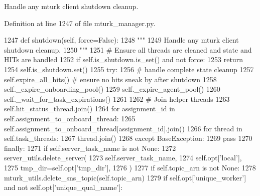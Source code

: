 \begin{DoxyVerb}Handle any mturk client shutdown cleanup.
\end{DoxyVerb}
 

Definition at line 1247 of file mturk\+\_\+manager.\+py.


\begin{DoxyCode}
1247     \textcolor{keyword}{def }shutdown(self, force=False):
1248         \textcolor{stringliteral}{"""}
1249 \textcolor{stringliteral}{        Handle any mturk client shutdown cleanup.}
1250 \textcolor{stringliteral}{        """}
1251         \textcolor{comment}{# Ensure all threads are cleaned and state and HITs are handled}
1252         \textcolor{keywordflow}{if} self.is\_shutdown.is\_set() \textcolor{keywordflow}{and} \textcolor{keywordflow}{not} force:
1253             \textcolor{keywordflow}{return}
1254         self.is\_shutdown.set()
1255         \textcolor{keywordflow}{try}:
1256             \textcolor{comment}{# handle complete state cleanup}
1257             self.expire\_all\_hits()  \textcolor{comment}{# ensure no hits sneak by after shutdown}
1258             self.\_expire\_onboarding\_pool()
1259             self.\_expire\_agent\_pool()
1260             self.\_wait\_for\_task\_expirations()
1261 
1262             \textcolor{comment}{# Join helper threads}
1263             self.hit\_status\_thread.join()
1264             \textcolor{keywordflow}{for} assignment\_id \textcolor{keywordflow}{in} self.assignment\_to\_onboard\_thread:
1265                 self.assignment\_to\_onboard\_thread[assignment\_id].join()
1266             \textcolor{keywordflow}{for} thread \textcolor{keywordflow}{in} self.task\_threads:
1267                 thread.join()
1268         \textcolor{keywordflow}{except} BaseException:
1269             \textcolor{keywordflow}{pass}
1270         \textcolor{keywordflow}{finally}:
1271             \textcolor{keywordflow}{if} self.server\_task\_name \textcolor{keywordflow}{is} \textcolor{keywordflow}{not} \textcolor{keywordtype}{None}:
1272                 server\_utils.delete\_server(
1273                     self.server\_task\_name,
1274                     self.opt[\textcolor{stringliteral}{'local'}],
1275                     tmp\_dir=self.opt[\textcolor{stringliteral}{'tmp\_dir'}],
1276                 )
1277             \textcolor{keywordflow}{if} self.topic\_arn \textcolor{keywordflow}{is} \textcolor{keywordflow}{not} \textcolor{keywordtype}{None}:
1278                 mturk\_utils.delete\_sns\_topic(self.topic\_arn)
1279             \textcolor{keywordflow}{if} self.opt[\textcolor{stringliteral}{'unique\_worker'}] \textcolor{keywordflow}{and} \textcolor{keywordflow}{not} self.opt[\textcolor{stringliteral}{'unique\_qual\_name'}]:

\end{DoxyCode}
